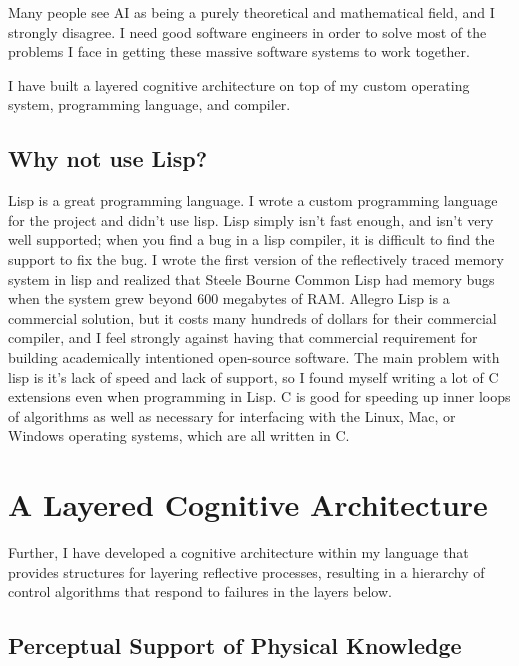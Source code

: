 Many people see AI as being a purely theoretical and mathematical
field, and I strongly disagree.  I need good software engineers in
order to solve most of the problems I face in getting these massive
software systems to work together.

I have built a layered cognitive architecture on top of my custom
operating system, programming language, and compiler.

\subsection{Why not use Lisp?}

Lisp is a great programming language.  I wrote a custom programming
language for the project and didn't use lisp.  Lisp simply isn't fast
enough, and isn't very well supported; when you find a bug in a lisp
compiler, it is difficult to find the support to fix the bug.  I wrote
the first version of the reflectively traced memory system in lisp and
realized that Steele Bourne Common Lisp had memory bugs when the
system grew beyond 600 megabytes of RAM.  Allegro Lisp is a commercial
solution, but it costs many hundreds of dollars for their commercial
compiler, and I feel strongly against having that commercial
requirement for building academically intentioned open-source
software.  The main problem with lisp is it's lack of speed and lack
of support, so I found myself writing a lot of C extensions even when
programming in Lisp.  C is good for speeding up inner loops of
algorithms as well as necessary for interfacing with the Linux, Mac,
or Windows operating systems, which are all written in C.

\section{A Layered Cognitive Architecture}

Further, I have developed a cognitive architecture within my
language that provides structures for layering reflective processes,
resulting in a hierarchy of control algorithms that respond to
failures in the layers below.


\subsection{Perceptual Support of Physical Knowledge}

